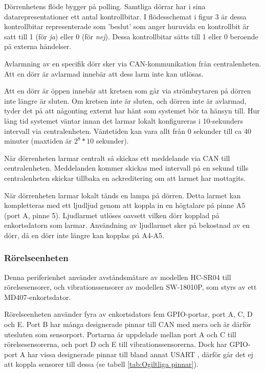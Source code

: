 \documentclass{article}
\begin{document}
Dörrenhetens flöde bygger på polling. Samtliga dörrar har i sina datarepresentationer
ett antal kontrollbitar. I flödesschemat i figur 3 är dessa kontrollbitar representerade
som 'beslut' som anger huruvida en kontrollbit är satt till 1 (för \textit{ja}) eller 0
(för \textit{nej}). Dessa kontrollbitar sätts till 1 eller 0 beroende på externa händelser.

Avlarmning av en specifik dörr sker via CAN-kommunikation från centralenheten. Att en dörr är avlarmad
innebär att dess larm inte kan utlösas.

Att en dörr är öppen innebär att kretsen som går via strömbrytaren på dörren inte längre är sluten.
Om kretsen inte är sluten, och dörren inte är avlarmad, tyder det på att någonting externt har hänt 
som systemet bör ta hänsyn till. Hur lång tid systemet väntar innan det larmar lokalt konfigureras i
 10-sekunders intervall via centralenheten. Väntetiden kan vara allt från 0 sekunder till ca 40 minuter
   (maxtiden är $2^8 *10$ sekunder).

När dörrenheten larmar centralt så skickas ett meddelande via CAN till centralenheten. Meddelanden
kommer skickas med intervall på en sekund tills centralenheten skickar tillbaka en ackreditering om att larmet har
 mottagits.

När dörrenheten larmar lokalt tänds en lampa på dörren. Detta larmet kan kompletteras med ett  ljudljud
genom att koppla in en högtalare på pinne A5 (port A, pinne 5). Ljudlarmet utlöses oavsett vilken dörr kopplad på enkortsdatorn som larmar. Användning av ljudlarmet sker på bekostnad av en dörr, då en dörr inte längre kan kopplas på A4-A5. 


\subsubsection{Rörelseenheten}
Denna periferienhet använder avståndsmätare av modellen HC-SR04\cite{HC-SR04} till rörelsesensorer,
 och vibrationssensorer av modellen SW-18010P\cite{SW-18010P}, som styrs av ett MD407-enkortsdator.

Rörelseenheten använder fyra av enkortsdators fem GPIO-portar, port A, C, D och E. 
Port B har många designerade pinnar till CAN med mera och är därför utesluten som 
sensorport. Portarna är uppdelade mellan port A och C till rörelsesensorerna,
och port D och E till vibrationssensorerna. Dock har GPIO-port A har vissa designerade pinnar 
till bland annat USART , därför går det ej att koppla sensorer till dessa (se tabell \ref{tab:Ogiltliga pinnar}).
\end{document}
